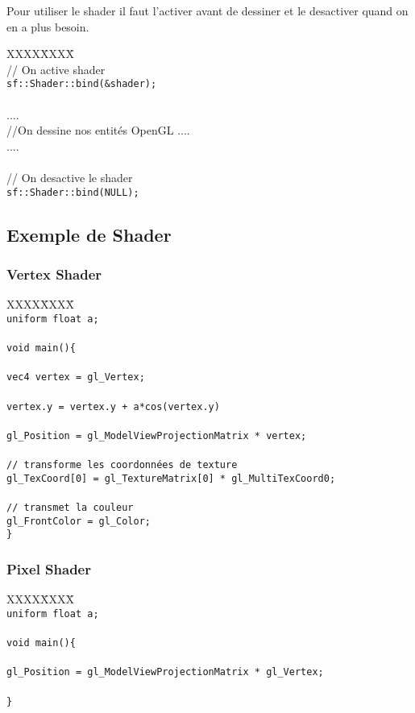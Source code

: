 Pour utiliser le shader il faut l'activer avant de dessiner et le desactiver quand on en a plus besoin.


\begin{tabbing}
XXXX\=XXXX\= \kill\\
\> // On active shader\\
\> \verb|sf::Shader::bind(&shader);|\\
\\
\> ....\\
\> //On dessine nos entités OpenGL ....\\
\> ....\\
\\
\> // On desactive le shader\\
\> \verb|sf::Shader::bind(NULL);|\\
\end{tabbing}

\subsection{Exemple de Shader}
\subsubsection{Vertex Shader}

\begin{tabbing}
XXXX\=XXXX\= \kill\\
\> \verb|uniform float a;|\\
\> \\
\> \verb|void main(){|\\
\> \\
\>\> \verb|vec4 vertex = gl_Vertex;| \\
\> \\
\>\> \verb|vertex.y = vertex.y + a*cos(vertex.y)| \\
\> \\
\>\> \verb|gl_Position = gl_ModelViewProjectionMatrix * vertex;|\\
\> \\
\>\> \verb|// transforme les coordonnées de texture|\\
\>\> \verb|gl_TexCoord[0] = gl_TextureMatrix[0] * gl_MultiTexCoord0;|\\
\> \\
\>\> \verb|// transmet la couleur|\\
\>\> \verb|gl_FrontColor = gl_Color;|\\
\> \verb|}|\\
\end{tabbing}


\subsubsection{Pixel Shader}

\begin{tabbing}
XXXX\=XXXX\= \kill\\
\> \verb|uniform float a;| \\
\> \\
\> \verb|void main(){|\\
\> \\
\> \verb|gl_Position = gl_ModelViewProjectionMatrix * gl_Vertex;|\\
\> \\
\> \verb|}|\\
\end{tabbing}